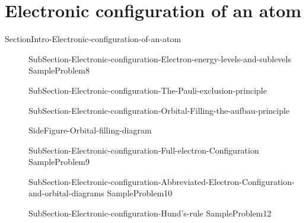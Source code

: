 \documentclass[main.tex]{subfiles}
\newcommand\chapterlabel{Ch-radiation}\setcounter{figurenewcounter}{0}\setcounter{tablenewcounter}{0}\setcounter{formulanewcounter}{0}
\begin{document}
\section{Electronic configuration of an atom}{SectionIntro-Electronic-configuration-of-an-atom}
\sloppy
\begin{description}
\item[] {SubSection-Electronic-configuration-Electron-energy-levels-and-sublevels}
  {SampleProblem8}
\item[] {SubSection-Electronic-configuration-The-Pauli-exclusion-principle}
     \label{Fig:{\chapterlabel}\thefigurenewcounter} 

\item[]{SubSection-Electronic-configuration-Orbital-Filling-the-aufbau-principle}

{SideFigure-Orbital-filling-diagram}
 \item[] {SubSection-Electronic-configuration-Full-electron-Configuration}
  {SampleProblem9}

\item[] 
{SubSection-Electronic-configuration-Abbreviated-Electron-Configuration-and-orbital-diagrams}
  {SampleProblem10}
  \item[] {SubSection-Electronic-configuration-Hund's-rule}
{SampleProblem12}
\end{description}
\newpage
\end{document}
